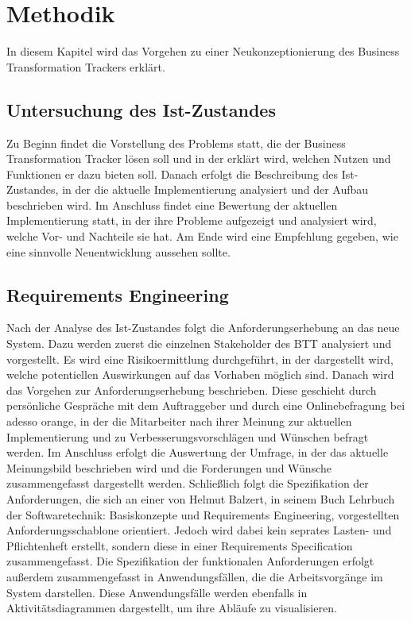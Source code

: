 \section{Methodik}
In diesem Kapitel wird das Vorgehen zu einer Neukonzeptionierung des Business Transformation Trackers erklärt.

\subsection{Untersuchung des Ist-Zustandes}
Zu Beginn findet die Vorstellung des Problems statt, die der Business Transformation Tracker lösen soll und in der erklärt wird, welchen Nutzen und Funktionen er dazu bieten soll. Danach erfolgt die Beschreibung des Ist-Zustandes, in der die aktuelle Implementierung analysiert und der Aufbau beschrieben wird. Im Anschluss findet eine Bewertung der aktuellen Implementierung statt, in der ihre Probleme aufgezeigt und analysiert wird, welche Vor- und Nachteile sie hat. Am Ende wird eine Empfehlung gegeben, wie eine sinnvolle Neuentwicklung aussehen sollte.

\subsection{Requirements Engineering}
Nach der Analyse des Ist-Zustandes folgt die Anforderungserhebung an das neue System. Dazu werden zuerst die einzelnen Stakeholder des BTT analysiert und vorgestellt. Es wird eine Risikoermittlung durchgeführt, in der dargestellt wird, welche potentiellen Auswirkungen auf das Vorhaben möglich sind. Danach wird das Vorgehen zur Anforderungserhebung beschrieben. Diese geschieht durch persönliche Gespräche mit dem Auftraggeber und durch eine Onlinebefragung bei adesso orange, in der die Mitarbeiter nach ihrer Meinung zur aktuellen Implementierung und zu Verbesserungsvorschlägen und Wünschen befragt werden. Im Anschluss erfolgt die Auswertung der Umfrage, in der das aktuelle Meinungsbild beschrieben wird und die Forderungen und Wünsche zusammengefasst dargestellt werden. Schließlich folgt die Spezifikation der Anforderungen, die sich an einer von Helmut Balzert, in seinem Buch \glqq{}Lehrbuch der Softwaretechnik: Basiskonzepte und Requirements Engineering\grqq{}, vorgestellten Anforderungsschablone orientiert. Jedoch wird dabei kein seprates Lasten- und Pflichtenheft erstellt, sondern diese in einer \glqq{}Requirements Specification\grqq{} zusammengefasst. Die Spezifikation der funktionalen Anforderungen erfolgt außerdem zusammengefasst in Anwendungsfällen, die die Arbeitsvorgänge im System darstellen. Diese Anwendungsfälle werden ebenfalls in Aktivitätsdiagrammen dargestellt, um ihre Abläufe zu visualisieren. 

